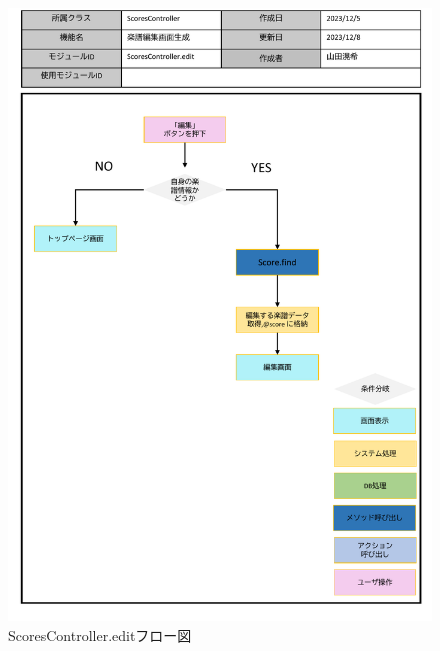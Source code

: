\begin{figure}
	\centering
	\includegraphics[scale=0.6]{img/Scores/pptx/ScoresController_edit.pdf}
	\caption{ScoresController.editフロー図}
\end{figure}
\clearpage
